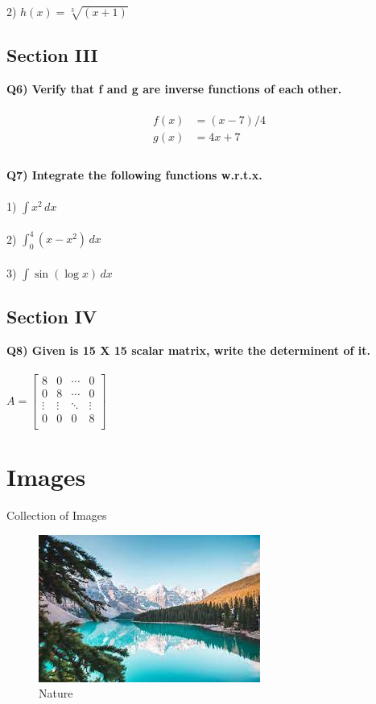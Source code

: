 \documentclass[12pt]{article}
\begin{document}
2) $ h(x) = 
\sqrt[3]{(x+1)}
$ 




\subsection*{Section III}
\textbf{Q6) Verify that f and g are inverse functions of each other.\\\\}
\begin{align*}
f(x) &= (x-7)/4 \\
g(x) &= 4x+7 \\
\end{align*}
\\
\textbf{Q7) Integrate the following functions w.r.t.x.\\\\}
1) $\int x^2\, dx $ \\\\
2) $\int_{0}^{4} (x-x^2)\, dx $ \\\\
3) $\int \sin{(\log{x})} \, dx $ \\




\subsection*{Section IV}
\textbf{Q8) Given is 15 X 15 scalar matrix, write the determinent of it.\\\\}
$ A = 
\begin{bmatrix}
8 & 0 & \cdots & 0 \\
0 & 8 & \cdots & 0 \\
\vdots & \vdots & \ddots  & \vdots \\
0 & 0 & 0 & 8 \\
\end{bmatrix}
$












\newpage
\section{Images}
\huge Collection of Images \\
\begin{figure}[h]
\centering
\includegraphics[scale=0.9]{./alms}
\caption{Nature}
\label{fig:Processing Mind}
\end{figure}
\end{document}
